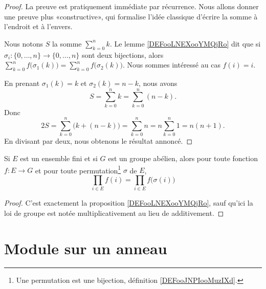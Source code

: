 \begin{proof}
    La preuve est pratiquement immédiate par récurrence. Nous allons donner une preuve plus «constructive», qui formalise l'idée classique d'écrire la somme à l'endroit et à l'envers.


    Nous notons \( S\) la somme \( \sum_{k=0}^nk\). Le lemme \ref{DEFooLNEXooYMQjRo} dit que si \( \sigma_i\colon \{ 0,\ldots, n \}\to \{ 0,\ldots, n \}\) sont deux bijections, alors \( \sum_{k=0}^nf\big( \sigma_1(k) \big)=\sum_{k=0}^nf\big( \sigma_2(k) \big)\). Nous sommes intéressé au cas \( f(i)=i\).

    En prenant \( \sigma_1(k)=k\) et \( \sigma_2(k)=n-k\), nous avons
    \begin{equation}
        S=\sum_{k=0}^nk=\sum_{k=0}^n(n-k).
    \end{equation}
    Donc
    \begin{equation}
        2S=\sum_{k=0}^n\big( k+(n-k) \big)=\sum_{k=0}^nn=n\sum_{k=0}^n1=n(n+1).
    \end{equation}
    En divisant par deux, nous obtenons le résultat annoncé.
\end{proof}

\begin{proposition}     \label{PROPooQMUDooQQVRIe}
    Si \( E\) est un ensemble fini et si \( G\) est un groupe abélien, alors pour toute fonction \( f\colon E\to G\) et pour toute permutation\footnote{Une permutation est une bijection, définition \ref{DEFooJNPIooMuzIXd}.} \( \sigma\) de \( E\),
    \begin{equation}
        \prod_{i\in E}f(i)=\prod_{i\in E}f\big( \sigma(i) \big)
    \end{equation}
\end{proposition}

\begin{proof}
    C'est exactement la proposition \ref{DEFooLNEXooYMQjRo}, sauf qu'ici la loi de groupe est notée multiplicativement au lieu de additivement.
\end{proof}

\section{Module sur un anneau}

